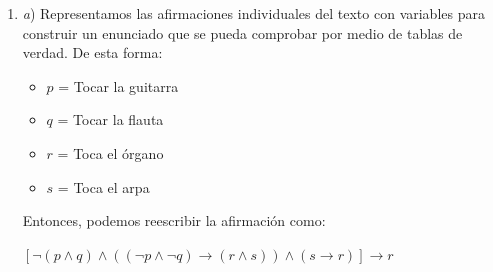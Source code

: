 \documentclass[11pt,a4paper]{article}
\begin{document}
\begin{enumerate}
Sean $x, y, \in \mathbb{Z}$ tales que $x > y$, entonces $ 0 < y -x$, y podemos reescribir $ 0 < \dfrac{1}{y-x}$ sin pérdida de generalidad. 

Sea $n \in 	\mathbb{N}$ tal que $\dfrac{1}{y-x} < n, \underbrace{1 < ny - nx}_{(1)}$

Sea $m \in \mathbb{N}$ tal que $m \le nx < m + 1$. Restando $m$ obtenemos $\underbrace{0 \le nx - m < 1}_{(2)}$

Relacionando (1) con (2)

\begin{center}
    $0 \le nx - m < 1 < ny-nx$
    
    $\underbrace{nx - m < 1 < ny-nx}_{(3)}$
\end{center}

Sumando $m$ a (3) 

\begin{center}
    $nx < 1 + m < ny - nx + m$ 
\end{center}

Como $m \le nx$; $-nx \le -m$; 

\begin{center}
$-nx + ny \le -m+ny$

$ny - nx + m \le ny$
\end{center}

Por ende, tenemos 

\begin{center}
    $nx < 1 + m < ny$
    
    $x < \dfrac{1 + m}{n} < y$, siendo $\dfrac{1 + m}{n}$ un número racional
\end{center}

\item


\textit{a}) Representamos las afirmaciones individuales del texto con variables para construir un enunciado que se pueda comprobar por medio de tablas de verdad. De esta forma:

\begin{itemize}
\item $p$ = Tocar la guitarra
\item $q$ = Tocar la flauta
\item $r$ = Toca el órgano
\item  $s$ = Toca el arpa
\end{itemize}
Entonces, podemos reescribir la afirmación como:

\begin{center}

$[\neg (p \wedge q) \wedge ((\neg p \wedge \neg q) \rightarrow (r \wedge s)) \wedge (s \rightarrow r)] \rightarrow r $


\end{center}
\end{enumerate}
\end{document}
